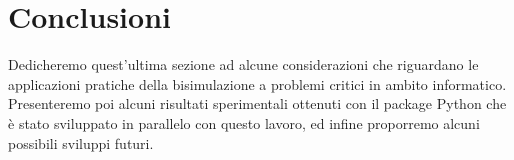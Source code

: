 \section{Conclusioni}
\label{sec:conclusions}

Dedicheremo quest'ultima sezione ad alcune considerazioni che riguardano le applicazioni pratiche della bisimulazione a problemi critici in ambito informatico. Presenteremo poi alcuni risultati sperimentali ottenuti con il package Python che è stato sviluppato in parallelo con questo lavoro, ed infine proporremo alcuni possibili sviluppi futuri.




